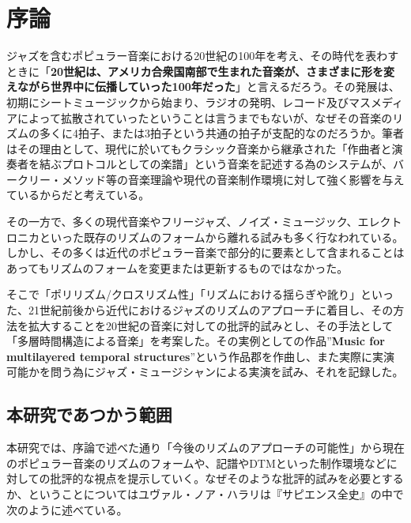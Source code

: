 \documentclass[uplatex,dvipdfmx]{ujarticle}
\begin{document}
\section{序論}
ジャズを含むポピュラー音楽における20世紀の100年を考え、その時代を表わすときに「{\bf 20世紀は、アメリカ合衆国南部で生まれた音楽が、さまざまに形を変えながら世界中に伝播していった100年だった}」\cite{murai:01}と言えるだろう。その発展は、初期にシートミュージックから始まり、ラジオの発明、レコード及びマスメディアによって拡散されていったということは言うまでもないが、なぜその音楽のリズムの多くに4拍子、または3拍子という共通の拍子が支配的なのだろうか。筆者はその理由として、現代に於いてもクラシック音楽から継承された「作曲者と演奏者を結ぶプロトコルとしての楽譜」という音楽を記述する為のシステムが、バークリー・メソッド等の音楽理論や現代の音楽制作環境に対して強く影響を与えているからだと考えている。

その一方で、多くの現代音楽やフリージャズ、ノイズ・ミュージック、エレクトロニカといった既存のリズムのフォームから離れる試みも多く行なわれている。しかし、その多くは近代のポピュラー音楽で部分的に要素として含まれることはあってもリズムのフォームを変更または更新するものではなかった。

そこで「ポリリズム/クロスリズム性」「リズムにおける揺らぎや訛り」といった、21世紀前後から近代におけるジャズのリズムのアプローチに着目し、その方法を拡大することを20世紀の音楽に対しての批評的試みとし、その手法として「多層時間構造による音楽」を考案した。その実例としての作品''{\bf Music for multilayered temporal structures}''\cite{yamato:01}という作品郡を作曲し、また実際に実演可能かを問う為にジャズ・ミュージシャンによる実演を試み、それを記録した。

\subsection{本研究であつかう範囲 \label{research_target}}
本研究では、序論で述べた通り「今後のリズムのアプローチの可能性」から現在のポピュラー音楽のリズムのフォームや、記譜やDTMといった制作環境などに対しての批評的な視点を提示していく。なぜそのような批評的試みを必要とするか、ということについてはユヴァル・ノア・ハラリは『サピエンス全史』の中で次のように述べている。\\
\end{document}
